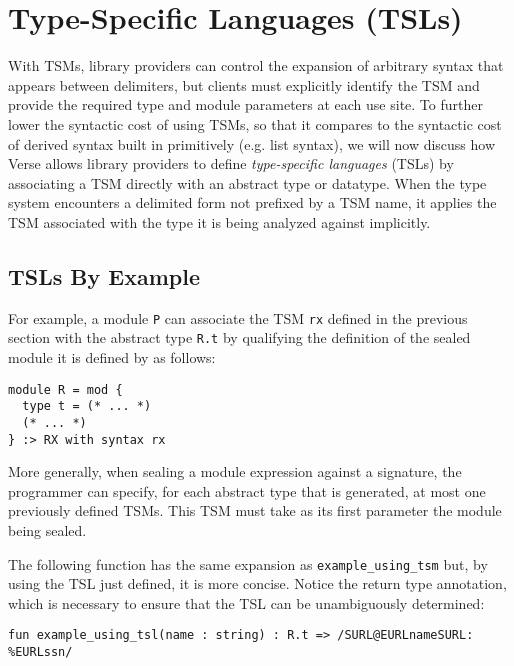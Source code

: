 \chapter{Type-Specific Languages (TSLs)}\label{chap:tsls}
With TSMs, library providers can control the expansion of arbitrary syntax that appears between delimiters, but clients must explicitly identify the TSM and provide the required type and module parameters at each use site. To further lower the syntactic cost of using TSMs, so that it compares to the syntactic cost of derived syntax built in primitively (e.g. list syntax), we will now discuss how Verse allows library providers to define \emph{type-specific languages} (TSLs) by associating a TSM directly with an abstract type or datatype. When the type system encounters a delimited form not prefixed by a TSM name, it applies the TSM associated with the type it is being analyzed against implicitly.

\section{TSLs By Example}
For example, a module \lstinline{P} can associate the TSM \lstinline{rx} defined in the previous section with the abstract type \lstinline{R.t} by qualifying the definition of the sealed module it is defined by as follows:
\begin{lstlisting}[numbers=none]
module R = mod {
  type t = (* ... *)
  (* ... *)
} :> RX with syntax rx
\end{lstlisting}
More generally, when sealing a module expression against a signature, the programmer can specify, for each abstract type that is generated, at most one previously defined TSMs. This TSM must take as its first parameter the module being sealed.

The following function has the same expansion as \lstinline{example_using_tsm} but, by using the TSL just defined, it is more concise. Notice the return type annotation, which is necessary to ensure that the TSL can be unambiguously determined:
\begin{lstlisting}[numbers=none]
fun example_using_tsl(name : string) : R.t => /SURL@EURLnameSURL: %EURLssn/
\end{lstlisting}

